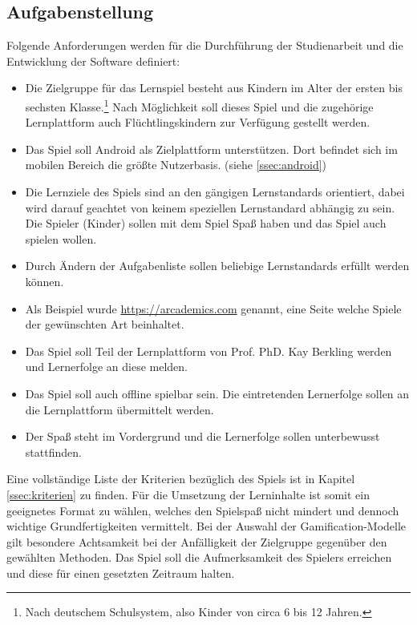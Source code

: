 \subsection{Aufgabenstellung}
	Folgende Anforderungen werden für die Durchführung der Studienarbeit und die Entwicklung der Software definiert:
	\begin{itemize}
		\item{ Die Zielgruppe für das Lernspiel besteht aus Kindern im Alter der ersten bis sechsten Klasse.\footnote{Nach deutschem Schulsystem, also Kinder von circa 6 bis 12 Jahren.} Nach Möglichkeit soll dieses Spiel und die zugehörige Lernplattform auch Flüchtlingskindern zur Verfügung gestellt werden. }
		\item{ Das Spiel soll Android als Zielplattform unterstützen. Dort befindet sich im mobilen Bereich die größte Nutzerbasis. (siehe \ref{ssec:android}) }
		\item{ Die Lernziele des Spiels sind an den gängigen Lernstandards orientiert, dabei wird darauf geachtet von keinem speziellen Lernstandard abhängig zu sein. Die Spieler (Kinder) sollen mit dem Spiel Spaß haben und das Spiel auch spielen wollen. }
		\item{ Durch Ändern der Aufgabenliste sollen beliebige Lernstandards erfüllt werden können. }
		\item{ Als Beispiel wurde \url{https://arcademics.com} genannt, eine Seite welche Spiele der gewünschten Art beinhaltet. }
		\item{ Das Spiel soll Teil der Lernplattform von Prof. PhD. Kay Berkling werden und Lernerfolge an diese melden. }
		\item{ Das Spiel soll auch offline spielbar sein. Die eintretenden Lernerfolge sollen an die Lernplattform übermittelt werden. }
		\item{ Der Spaß steht im Vordergrund und die Lernerfolge sollen unterbewusst stattfinden. }
	\end{itemize}
	Eine vollständige Liste der Kriterien bezüglich des Spiels ist in Kapitel \ref{ssec:kriterien} zu finden.
	Für die Umsetzung der Lerninhalte ist somit ein geeignetes Format zu wählen, welches den Spielspaß nicht mindert und dennoch wichtige Grundfertigkeiten vermittelt.
	Bei der Auswahl der Gamification-Modelle gilt besondere Achtsamkeit bei der Anfälligkeit der Zielgruppe gegenüber den gewählten Methoden. Das Spiel soll die Aufmerksamkeit des Spielers erreichen und diese für einen gesetzten Zeitraum halten.

